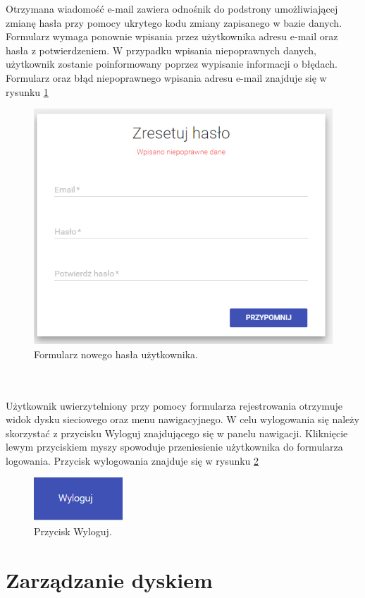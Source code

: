 Otrzymana wiadomość e-mail zawiera odnośnik do podstrony umożliwiającej zmianę hasła przy pomocy ukrytego kodu zmiany zapisanego w bazie danych. Formularz wymaga ponownie wpisania przez użytkownika adresu e-mail oraz hasła z potwierdzeniem. W przypadku wpisania niepoprawnych danych, użytkownik zostanie poinformowany poprzez wypisanie informacji o błędach. Formularz oraz błąd niepoprawnego wpisania adresu e-mail znajduje się w rysunku \ref{fig:9}
\begin{figure}[!h]
	\centering
	\includegraphics[width=0.7\linewidth]{"obrazy/6..2 ResetHasla"}
	\caption{Formularz nowego hasła użytkownika.}
	\label{fig:9}
\end{figure}
\\
\\
Użytkownik uwierzytelniony przy pomocy formularza rejestrowania otrzymuje widok dysku sieciowego oraz menu nawigacyjnego. W celu wylogowania się należy skorzystać z przycisku Wyloguj znajdującego się w panelu nawigacji. Kliknięcie lewym przyciskiem myszy spowoduje przeniesienie użytkownika do formularza logowania. Przycisk wylogowania znajduje się w rysunku \ref{fig:10}
\begin{figure}[!h]
	\centering
	\includegraphics[width=0.7\linewidth]{"obrazy/6..2 Wyloguj"}
	\caption{Przycisk Wyloguj.}
	\label{fig:10}
\end{figure}
\newpage
\section{Zarządzanie dyskiem}

